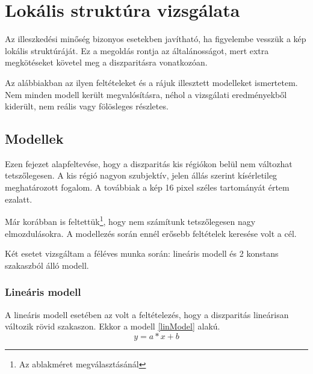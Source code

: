 \chapter{Lokális struktúra vizsgálata}\label{sect:LocalStruct}

Az illeszkedési minőség bizonyos esetekben javítható, ha figyelembe vesszük a kép lokális struktúráját.
Ez a megoldás rontja az általánosságot, mert extra megkötéseket követel meg a diszparitásra vonatkozóan.

Az alábbiakban az ilyen feltételeket és a rájuk illesztett modelleket ismertetem.
Nem minden modell került megvalósításra, néhol a vizsgálati eredményekből kiderült, nem reális vagy fölösleges részletes.

\section{Modellek}\label{sect:Models}

Ezen fejezet alapfeltevése, hogy a diszparitás kis régiókon belül nem változhat tetszőlegesen.
A kis régió nagyon szubjektív, jelen állás szerint kísérletileg meghatározott fogalom.
A továbbiak a kép 16 pixel széles tartományát értem ezalatt.

Már korábban is feltettük\footnote{Az ablakméret megválasztásánál}, hogy nem számítunk tetszőlegesen nagy elmozdulásokra.
A modellezés során ennél erősebb feltételek keresése volt a cél.

Két esetet vizsgáltam a féléves munka során: lineáris modell és 2 konstans szakaszból álló modell.

\subsection{Lineáris modell}\label{sect:linearModel}

A lineáris modell esetében az volt a feltételezés, hogy a diszparitás lineárisan változik rövid szakaszon.
Ekkor a modell \eqref{linModel} alakú.
\begin{equation}
y = a*x + b
\label{eq:linModel}
\end{equation}

